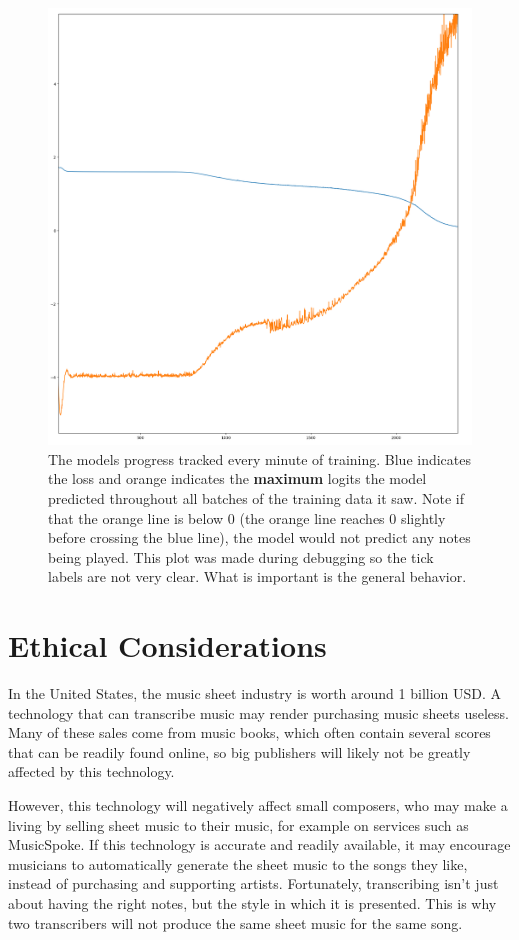 \documentclass[a4paper,twocolumn,10pt]{article}
\begin{document}
\begin{figure}[H]
  \centering
  \includegraphics[width=\linewidth]{figures/debug.png}
  \caption{The models progress tracked every minute of training. Blue indicates the loss and orange indicates the \textbf{maximum} logits the model predicted throughout all batches of the training data it saw. Note if that the orange line is below 0 (the orange line reaches 0 slightly before crossing the blue line), the model would not predict any notes being played. This plot was made during debugging so the tick labels are not very clear. What is important is the general behavior.}
  \label{fig:lr}
\end{figure}

\section{Ethical Considerations}
In the United States, the music sheet industry is worth around 1 billion USD\cite{musicspoke}. A technology that can transcribe music may render purchasing music sheets useless. Many of these sales come from music books, which often contain several scores that can be readily found online, so big publishers will likely not be greatly affected by this technology.

However, this technology will negatively affect small composers, who may make a living by selling sheet music to their music, for example on services such as MusicSpoke\cite{musicspoke}. If this technology is accurate and readily available, it may encourage musicians to automatically generate the sheet music to the songs they like, instead of purchasing and supporting artists. Fortunately, transcribing isn’t just about having the right notes, but the style in which it is presented. This is why two transcribers will not produce the same sheet music for the same song.
\end{document}
